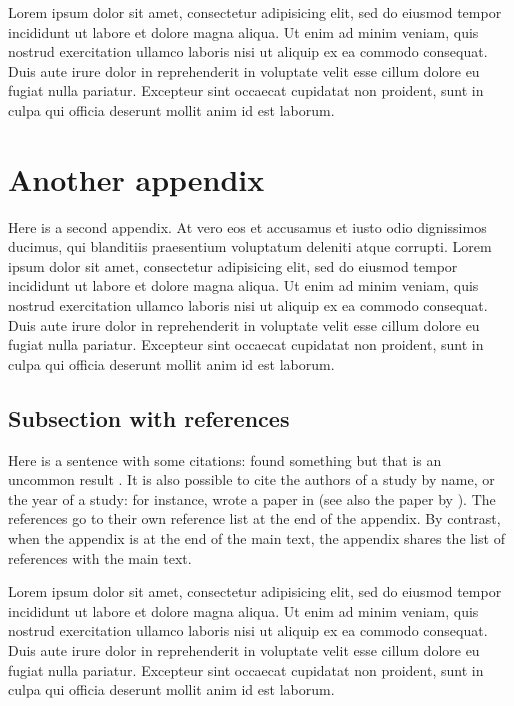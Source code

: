 \documentclass[letterpaper,11pt,leqno]{article}
\begin{document}
Lorem ipsum dolor sit amet, consectetur adipisicing elit, sed do eiusmod tempor incididunt ut labore et dolore magna aliqua. Ut enim ad minim veniam,
quis nostrud exercitation ullamco laboris nisi ut aliquip ex ea commodo
consequat. Duis aute irure dolor in reprehenderit in voluptate velit esse
cillum dolore eu fugiat nulla pariatur. Excepteur sint occaecat cupidatat non
proident, sunt in culpa qui officia deserunt mollit anim id est laborum.


\section{Another appendix}\label{a:appendix2}

Here is a second appendix. At vero eos et accusamus et iusto odio dignissimos ducimus, qui blanditiis praesentium voluptatum deleniti atque corrupti. Lorem ipsum dolor sit amet, consectetur adipisicing elit, sed do eiusmod tempor incididunt ut labore et dolore magna aliqua. Ut enim ad minim veniam, quis nostrud exercitation ullamco laboris nisi ut aliquip ex ea commodo consequat. Duis aute irure dolor in reprehenderit in voluptate velit esse cillum dolore eu fugiat nulla pariatur. Excepteur sint occaecat cupidatat non
proident, sunt in culpa qui officia deserunt mollit anim id est laborum.

\subsection{Subsection with references}\label{a:subappendix}

Here is a sentence with some citations: \citet{MS19,MS21} found something but that is an uncommon result \citep[chapter 5]{M12}. It is also possible to cite the authors of a study by name, or the year of a study: for instance, \citeauthor{EMM21} wrote a paper in \citeyear{EMM21} (see also the paper by \citealp{M14}). The references go to their own reference list at the end of the appendix. By contrast, when the appendix is at the end of the main text, the appendix shares the list of references with the main text. 

Lorem ipsum dolor sit amet, consectetur adipisicing elit, sed do eiusmod
tempor incididunt ut labore et dolore magna aliqua. Ut enim ad minim veniam,
quis nostrud exercitation ullamco laboris nisi ut aliquip ex ea commodo
consequat. Duis aute irure dolor in reprehenderit in voluptate velit esse
cillum dolore eu fugiat nulla pariatur. Excepteur sint occaecat cupidatat non
proident, sunt in culpa qui officia deserunt mollit anim id est laborum.
\end{document}
